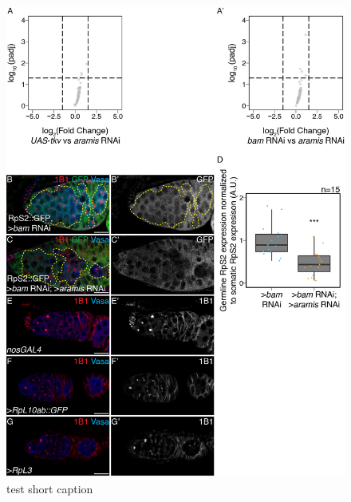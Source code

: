 \documentclass[12pt,oneside]{reedthesis}
\begin{document}
\begin{figure}

{\centering \includegraphics[width=6.5 in,height=8.9375 in]{./figure/Ribosome Biogenesis/Ribosome Biogenesis 4S} 

}

\caption[test short caption]{test short caption}\label{fig:unnamed-chunk-13}
\end{figure}
\end{document}
